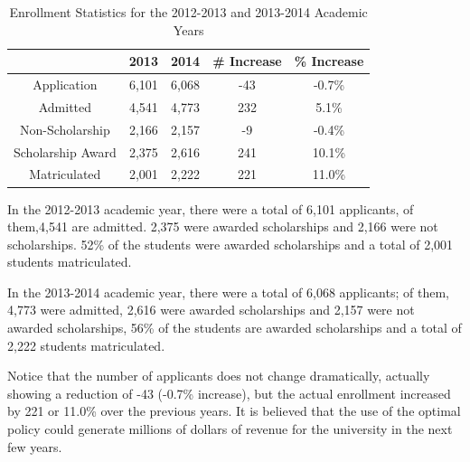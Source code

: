 \documentclass[12pt,english]{report}
\begin{document}
\begin{table}[ht!]
\centering
\begin{tabular}{|c|c|c|c|c|}
\hline
& 2013 & 2014 & \# Increase & \% Increase \\ \hline
Application                    & 6,101 & 6,068 & -43         & -0.7\%      \\
\hline
Admitted                       & 4,541 & 4,773 & 232         & 5.1\%       \\
\hline
Non-Scholarship                & 2,166 & 2,157 & -9          & -0.4\%      \\
\hline
Scholarship Award              & 2,375 & 2,616 & 241         & 10.1\%      \\
\hline
Matriculated                   & 2,001 & 2,222 & 221         & 11.0\%      \\
\hline
\end{tabular}
\caption{Enrollment Statistics for the 2012-2013 and 2013-2014 Academic Years}
\label{enroll_stats1}

\end{table}
In the 2012-2013 academic year, there were a total of 6,101 applicants, of
them,4,541   are admitted. 2,375 were awarded scholarships and 2,166 were not
scholarships. 52\% of the students were awarded scholarships and a total of
2,001 students matriculated.

In the 2013-2014 academic year, there were a total of 6,068 applicants; of
them, 4,773 were admitted, 2,616 were awarded scholarships and 2,157 were not
awarded scholarships, 56\% of the students are awarded scholarships and a total
of 2,222 students matriculated.

Notice that the number of applicants does not change dramatically, actually
showing a reduction of -43 (-0.7\% increase), but the actual enrollment
increased by 221  or 11.0\% over the previous years.  It is believed that the
use of the optimal policy could generate millions of dollars of revenue for the
university in the next few years.
\end{document}
